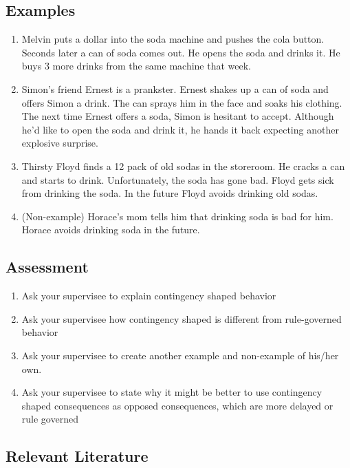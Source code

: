 \subsection{Examples}
\begin{enumerate}
\item Melvin puts a dollar into the soda machine and pushes the cola button. Seconds later a can of soda comes out. He opens the soda and drinks it.  He buys 3 more drinks from the same machine that week.
\item Simon's friend Ernest is a prankster.  Ernest shakes up a can of soda and offers Simon a drink.  The can sprays him in the face and soaks his clothing.  The next time Ernest offers a soda, Simon is hesitant to accept.  Although he'd like to open the soda and drink it, he hands it back expecting another explosive surprise.
\item Thirsty Floyd finds a 12 pack of old sodas in the storeroom.  He cracks a can and starts to drink. Unfortunately, the soda has gone bad. Floyd gets sick from drinking the soda. In the future Floyd avoids drinking old sodas.
\item (Non-example) Horace's mom tells him that drinking soda is bad for him. Horace avoids drinking soda in the future.
%
\end{enumerate}
%
\subsection{Assessment}
\begin{enumerate}
\item Ask your supervisee to explain contingency shaped behavior 
\item Ask your supervisee how contingency shaped is different from rule-governed behavior
\item Ask your supervisee to create another example and non-example of his/her own. 
\item Ask your supervisee to state why it might be better to use contingency shaped consequences as opposed consequences, which are more delayed or rule governed      
\end{enumerate}
%
\subsection{Relevant Literature}
\begin{refsection}
\nocite{test,alang2017police,clayton2018black}
\printbibliography[heading=none]
\end{refsection}
%
